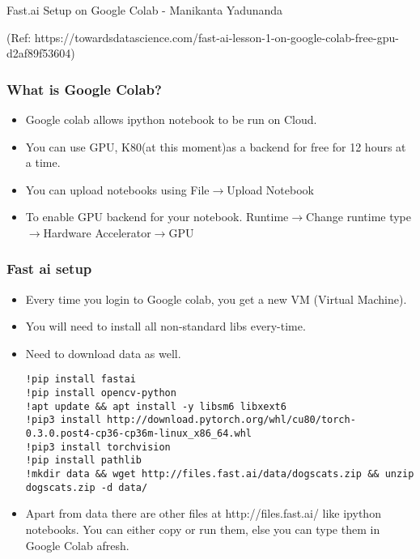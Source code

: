 
\begin{frame}[fragile]\frametitle{}
\begin{center}
{\Large Fast.ai Setup on Google Colab - Manikanta Yadunanda}
\end{center}

\tiny{(Ref: https://towardsdatascience.com/fast-ai-lesson-1-on-google-colab-free-gpu-d2af89f53604)}
\end{frame}

\begin{frame}[fragile] \frametitle{What is Google Colab?}

\begin{itemize}
\item Google colab allows ipython notebook to be run on Cloud.
\item You can use GPU, K80(at this moment)as a backend for free for 12 hours at a time.
\item You can upload notebooks using File$\rightarrow$Upload Notebook
\item To enable GPU backend for your notebook. Runtime$\rightarrow$Change runtime type$\rightarrow$Hardware Accelerator$\rightarrow$GPU
\end{itemize}
\end{frame}

\begin{frame}[fragile] \frametitle{Fast ai setup}
\begin{itemize}
\item Every time you login to Google colab, you get a new VM (Virtual Machine). 
\item You will need to install all non-standard libs every-time.
\item Need to download data as well.
\begin{lstlisting}
!pip install fastai
!pip install opencv-python
!apt update && apt install -y libsm6 libxext6
!pip3 install http://download.pytorch.org/whl/cu80/torch-0.3.0.post4-cp36-cp36m-linux_x86_64.whl 
!pip3 install torchvision
!pip install pathlib
!mkdir data && wget http://files.fast.ai/data/dogscats.zip && unzip dogscats.zip -d data/
\end{lstlisting}
\item Apart from data there are other files at http://files.fast.ai/ like ipython notebooks. You can either copy or run them, else you can type them in Google Colab afresh.
\end{itemize}

\end{frame}


